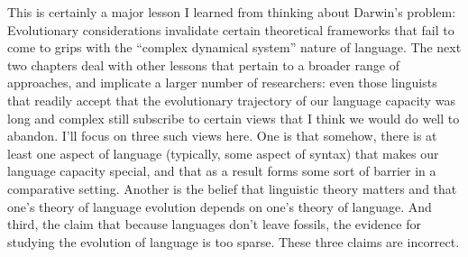 This is certainly a major lesson I learned from thinking about Darwin's problem: Evolutionary considerations invalidate certain theoretical frameworks that fail to come to grips with the ``complex dynamical system'' nature of language. The next two chapters deal with other lessons that pertain to a broader range of approaches, and implicate a larger number of researchers: even those linguists that readily accept that the evolutionary trajectory of our language capacity was long and complex still subscribe to certain views that I think we would do well to abandon. I'll focus on three such views here. One is that somehow, there is at least one aspect of language (typically, some aspect of syntax) that makes our language capacity special, and that as a result forms some sort of barrier in a comparative setting. Another is the belief that linguistic theory matters and that one's theory of language evolution depends on one's theory of language. And third, the claim that because languages don’t leave fossils, the evidence for studying the evolution of language is too sparse. These three claims are incorrect.

